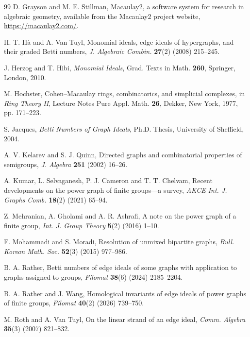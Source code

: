 \documentclass[12pt]{article}
\theoremstyle{definition}
\theoremstyle{remark}
\begin{document}
\begin{thebibliography}{99}
		D. Grayson and M. E. Stillman, Macaulay2, a software system for research in algebraic geometry, available from the Macaulay2 project website, \url{https://macaulay2.com/}.
		
		H. T. Hà and A. Van Tuyl, Monomial ideals, edge ideals of hypergraphs, and their graded Betti numbers, \emph{J. Algebraic Combin.} \textbf{27}(2) (2008) 215--245.
		
		J. Herzog and T. Hibi, \emph{Monomial Ideals}, Grad. Texts in Math. \textbf{260}, Springer, London, 2010.
		
		M. Hochster, Cohen--Macaulay rings, combinatorics, and simplicial complexes, in \emph{Ring Theory II}, Lecture Notes Pure Appl. Math. \textbf{26}, Dekker, New York, 1977, pp. 171--223.
		
		S. Jacques, \emph{Betti Numbers of Graph Ideals}, Ph.D. Thesis, University of Sheffield, 2004.
		
		A. V. Kelarev and S. J. Quinn, Directed graphs and combinatorial properties of semigroups, \emph{J. Algebra} \textbf{251} (2002) 16--26.
		
		A. Kumar, L. Selvaganesh, P. J. Cameron and T. T. Chelvam, Recent developments on the power graph of finite groups---a survey, \emph{AKCE Int. J. Graphs Comb.} \textbf{18}(2) (2021) 65--94.
		
		Z. Mehranian, A. Gholami and A. R. Ashrafi, A note on the power graph of a finite group, \emph{Int. J. Group Theory} \textbf{5}(2) (2016) 1--10.
		
		F. Mohammadi and S. Moradi, Resolution of unmixed bipartite graphs, \emph{Bull. Korean Math. Soc.} \textbf{52}(3) (2015) 977--986.
		
		B. A. Rather, Betti numbers of edge ideals of some graphs with application to graphs assigned to groups, \emph{Filomat} \textbf{38}(6) (2024) 2185--2204.
		
		B. A. Rather and J. Wang, Homological invariants of edge ideals of power graphs of finite groups, \emph{Filomat} \textbf{40}(2) (2026) 739--750.
		
		M. Roth and A. Van Tuyl, On the linear strand of an edge ideal, \emph{Comm. Algebra} \textbf{35}(3) (2007) 821--832.
		

\end{thebibliography}
\end{document}
